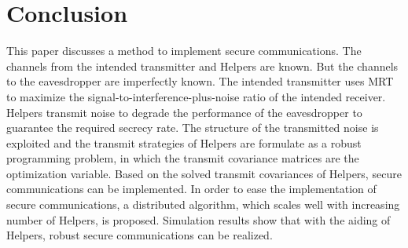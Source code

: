 \documentclass[conference]{IEEEtran}
\begin{document}




\section{Conclusion} \label{sec:conclusion}
This paper discusses a method to implement secure communications. The channels from the intended transmitter and Helpers are known. But the channels to the eavesdropper are imperfectly known. The intended transmitter uses MRT to maximize the signal-to-interference-plus-noise ratio of the intended receiver. Helpers transmit noise to degrade the performance of the eavesdropper to guarantee the required secrecy rate. The structure of the transmitted noise is exploited and the transmit strategies of Helpers are formulate as a robust programming problem, in which the transmit covariance matrices are the optimization variable. Based on the solved transmit covariances of Helpers, secure communications can be implemented. In order to ease the implementation of secure communications, a distributed algorithm, which scales well with increasing number of Helpers, is proposed. Simulation results show that with the aiding of Helpers, robust secure communications can be realized.













\end{document}
